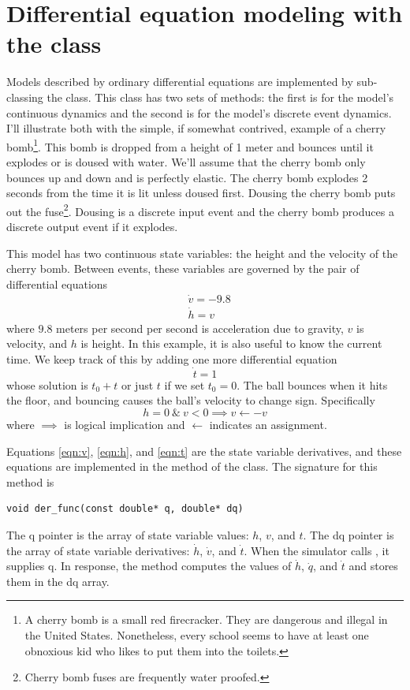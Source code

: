\section{Differential equation modeling with the  class}
Models described by ordinary differential equations are implemented by sub-classing the  class. This class has two sets of methods: the first is for the model's continuous dynamics and the second is for the model's discrete event dynamics. I'll illustrate both with the simple, if somewhat contrived, example of a cherry bomb\footnote{A cherry bomb is a small red firecracker. They are dangerous and illegal in the United States. Nonetheless, every school seems to have at least one obnoxious kid who likes to put them into the toilets.}. This bomb is dropped from a height of 1 meter and bounces until it explodes or is doused with water. We'll assume that the cherry bomb only bounces up and down and is perfectly elastic. The cherry bomb explodes 2 seconds from the time it is lit unless doused first. Dousing the cherry bomb puts out the fuse\footnote{Cherry bomb fuses are frequently water proofed.}. Dousing is a discrete input event and the cherry bomb produces a discrete output event if it explodes.

This model has two continuous state variables: the height and the velocity of the cherry bomb. Between events, these variables are governed by the pair of differential equations
\begin{align}
&\dot{v} = -9.8 \label{eqn:v} \\
&\dot{h} = v \label{eqn:h}
\end{align}
where $9.8$ meters per second per second is acceleration due to gravity, $v$ is velocity, and $h$ is height. In this example, it is also useful to know the current time. We keep track of this by adding one more differential equation
\begin{equation}
\dot{t} = 1 \label{eqn:t}
\end{equation}
whose solution is $t_0 + t$ or just $t$ if we set $t_0 = 0$. The ball bounces when it hits the floor, and bouncing causes the ball's velocity to change sign. Specifically
\begin{equation}
h = 0 \ \& \ v < 0 \implies v \leftarrow -v \label{eqn:state_event}
\end{equation}
where $\implies$ is logical implication and $\leftarrow$ indicates an assignment.

Equations \ref{eqn:v}, \ref{eqn:h}, and \ref{eqn:t} are the state variable derivatives, and these equations are implemented in the  method of the  class. The signature for this method is
\begin{verbatim}
void der_func(const double* q, double* dq)
\end{verbatim}
The q pointer is the array of state variable values: $h$, $v$, and $t$. The dq pointer is the array of state variable derivatives: $\dot{h}$, $\dot{v}$, and $\dot{t}$. When the simulator calls , it supplies q. In response, the method computes the values of $\dot{h}$, $\dot{q}$, and $\dot{t}$ and stores them in the dq array.

